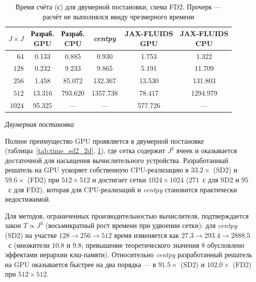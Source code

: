 \documentclass[a4paper,14pt]{extarticle}
\theoremstyle{theorem}
\theoremstyle{lemma}
\begin{document}
\begin{table}[!htb]
    \centering
    \caption{Время счёта (с) для двумерной постановки, схема FD2. Прочерк --- расчёт не выполнялся ввиду чрезмерного времени}
    \vspace{0.1cm}
    \label{tab:time_fd2_2d}
    \begin{tabular}{rccccc}
        \hline
        $J\times J$ & \makecell{Разраб.\\GPU} & \makecell{Разраб.\\CPU} & \textit{centpy} & \makecell{JAX-FLUIDS\\GPU} & \makecell{JAX-FLUIDS\\CPU} \\
        \hline
        $64$    & 0.133  & 0.885   & 0.930    & 1.753   & 1.322    \\
        $128$   & 0.232  & 9.233   & 9.865    & 5.191   & 11.709   \\
        $256$   & 1.458  & 85.072  & 132.367  & 13.530  & 131.803  \\
        $512$   & 13.316 & 793.620 & 1357.738 & 78.417  & 1294.979 \\
        $1024$  & 95.325 & ---     & ---      & 577.726 & ---      \\
        \hline
    \end{tabular}
\end{table}

\textit{Двумерная постановка}

Полное преимущество GPU проявляется в двумерной постановке
(таблицы~\ref{tab:time_sd2_2d}, \ref{tab:time_fd2_2d}), где сетка содержит $J^2$
ячеек и оказывается достаточной для насыщения вычислительного устройства.
Разработанный решатель на GPU ускоряет собственную CPU-реализацию в $33.2\times$
(SD2) и $59.6\times$ (FD2) при $512\times512$ и достигает сетки $1024\times1024$
($271$~с для SD2 и $95$~с для FD2), которая для CPU-реализаций и \textit{centpy}
становится практически недостижимой.

Для методов, ограниченных производительностью вычислителя, подтверждается закон
$T \propto J^3$ (восьмикратный рост времени при удвоении сетки): для
\textit{centpy} (SD2) на участке $128 \to 256 \to 512$ время изменяется как
$27.3 \to 293.4 \to 2888.5$~с (множители $10.8$ и $9.8$; превышение теоретического
значения $8$ обусловлено эффектами иерархии кэш-памяти). Относительно
\textit{centpy} разработанный решатель на GPU оказывается быстрее на два порядка
--- в $91.5\times$ (SD2) и $102.0\times$ (FD2) при $512\times512$.
\end{document}
